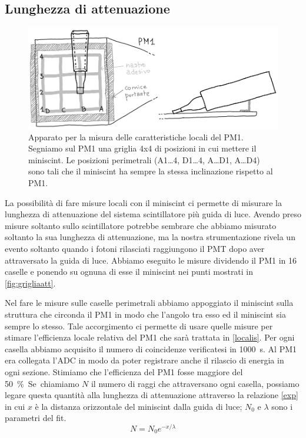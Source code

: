 \subsection{Lunghezza di attenuazione}
\label{attenu}

\begin{figure}
	\centering
	\includegraphics[width=\textwidth]{grigliaatt}
	\caption{\label{fig:grigliaatt}
	Apparato per la misura delle caratteristiche locali del PM1.
	Segniamo sul PM1 una griglia 4x4 di posizioni in cui mettere il miniscint.
	Le posizioni perimetrali (A1\dots4, D1\dots4, A\dots D1, A\dots D4)
	sono tali che il miniscint ha sempre la stessa inclinazione rispetto al PM1.}
\end{figure}

La possibilità di fare misure locali con il miniscint 
ci permette di misurare la lunghezza di attenuazione del sistema scintillatore più guida di luce. Avendo preso misure soltanto sullo scintillatore potrebbe sembrare che abbiamo misurato soltanto la sua lunghezza di attenuazione, ma la nostra strumentazione rivela un evento soltanto quando i fotoni rilasciati raggiungono il PMT dopo aver attraversato la guida di luce. 
Abbiamo eseguito le misure dividendo il PM1 in 16 caselle e ponendo su ognuna di esse il miniscint nei punti mostrati in \autoref{fig:grigliaatt}. 

Nel fare le misure sulle caselle perimetrali abbiamo appoggiato il miniscint sulla struttura che circonda il PM1 in modo che l'angolo tra esso ed il miniscint sia sempre lo stesso. Tale accorgimento ci permette di usare quelle misure per stimare l'efficienza locale relativa del PM1 che sarà trattata in \autoref{localis}.
Per ogni casella abbiamo acquisito il numero di coincidenze verificatesi in \SI{1000}{s}.
Al PM1 era collegata l'ADC in modo da poter registrare anche il rilascio di energia in ogni sezione.
Stimiamo che l'efficienza del PM1 fosse maggiore del \SI{50}\%.

Se chiamiamo $N$ il numero di raggi che attraversano ogni casella, possiamo legare questa quantità alla lunghezza di attenuazione attraverso la relazione \eqref{exp} in cui $x$ è la distanza orizzontale del miniscint dalla guida di luce; $N_0$ e $\lambda$ sono i parametri del fit. 
\begin{equation}
N=N_0 e^{-x/\lambda}  \label{exp}
\end{equation}

